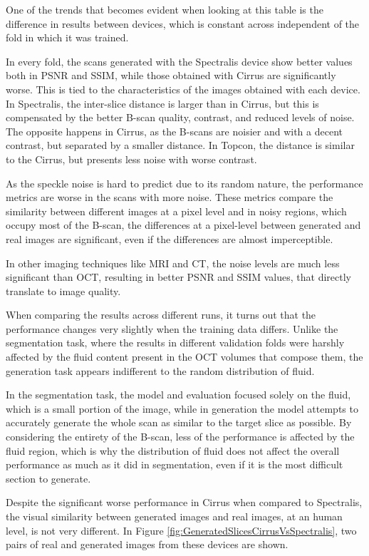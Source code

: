 One of the trends that becomes evident when looking at this table is the difference in results between devices, which is constant across independent of the fold in which it was trained.
\par
In every fold, the scans generated with the Spectralis device show better values both in PSNR and SSIM, while those obtained with Cirrus are significantly worse. This is tied to the characteristics of the images obtained with each device. In Spectralis, the inter-slice distance is larger than in Cirrus, but this is compensated by the better B-scan quality, contrast, and reduced levels of noise. The opposite happens in Cirrus, as the B-scans are noisier and with a decent contrast, but separated by a smaller distance. In Topcon, the distance is similar to the Cirrus, but presents less noise with worse contrast. 
\par
As the speckle noise is hard to predict due to its random nature, the performance metrics are worse in the scans with more noise. These metrics compare the similarity between different images at a pixel level and in noisy regions, which occupy most of the B-scan, the differences at a pixel-level between generated and real images are significant, even if the differences are almost imperceptible.
\par
In other imaging techniques like MRI and CT, the noise levels are much less significant than OCT, resulting in better PSNR and SSIM values, that directly translate to image quality.
\par
When comparing the results across different runs, it turns out that the performance changes very slightly when the training data differs. Unlike the segmentation task, where the results in different validation folds were harshly affected by the fluid content present in the OCT volumes that compose them, the generation task appears indifferent to the random distribution of fluid.
\par
In the segmentation task, the model and evaluation focused solely on the fluid, which is a small portion of the image, while in generation the model attempts to accurately generate the whole scan as similar to the target slice as possible. By considering the entirety of the B-scan, less of the performance is affected by the fluid region, which is why the distribution of fluid does not affect the overall performance as much as it did in segmentation, even if it is the most difficult section to generate.
\par
Despite the significant worse performance in Cirrus when compared to Spectralis, the visual similarity between generated images and real images, at an human level, is not very different. In Figure \ref{fig:GeneratedSlicesCirrusVsSpectralis}, two pairs of real and generated images from these devices are shown.
